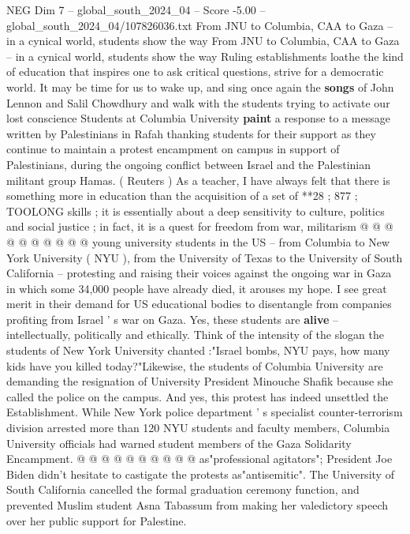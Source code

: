\begin{textsample}{NEG Dim 7 – global\_south\_2024\_04 – Score -5.00 – global\_south\_2024\_04/107826036.txt}  \label{ex:f7_neg_347}
From JNU to Columbia, CAA to Gaza -- in a cynical world, students show the way From JNU to Columbia, CAA to Gaza -- in a cynical world, students show the way Ruling establishments loathe the kind of education that inspires one to ask critical questions, strive for a democratic world.
It may be time for us to wake up, and sing once again the \textbf{songs} of John Lennon and Salil Chowdhury and walk with the students trying to activate our lost conscience Students at Columbia University \textbf{paint} a response to a message written by Palestinians in Rafah thanking students for their support as they continue to maintain a protest encampment on campus in support of Palestinians, during the ongoing conflict between Israel and the Palestinian militant group Hamas. ( Reuters ) As a teacher, I have always felt that there is something more in education than the acquisition of a set of **28 ; 877 ; TOOLONG skills ; it is essentially about a deep sensitivity to culture, politics and social justice ; in fact, it is a quest for freedom from war, militarism @ @ @ @ @ @ @ @ @ @ young university students in the US -- from Columbia to New York University ( NYU ), from the University of Texas to the University of South California -- protesting and raising their voices against the ongoing war in Gaza in which some 34,000 people have already died, it arouses my hope.
I see great merit in their demand for US educational bodies to disentangle from companies profiting from Israel ' s war on Gaza.
Yes, these students are \textbf{alive} -- intellectually, politically and ethically.
Think of the intensity of the slogan the students of New York University chanted :"Israel bombs, NYU pays, how many kids have you killed today?"Likewise, the students of Columbia University are demanding the resignation of University President Minouche Shafik because she called the police on the campus.
And yes, this protest has indeed unsettled the Establishment.
While New York police department ' s specialist counter-terrorism division arrested more than 120 NYU students and faculty members, Columbia University officials had warned student members of the Gaza Solidarity Encampment. @ @ @ @ @ @ @ @ @ @ as"professional agitators"; President Joe Biden didn't hesitate to castigate the protests as"antisemitic".
The University of South California cancelled the formal graduation ceremony function, and prevented Muslim student Asna Tabassum from making her valedictory speech over her public support for Palestine.

\end{textsample}

